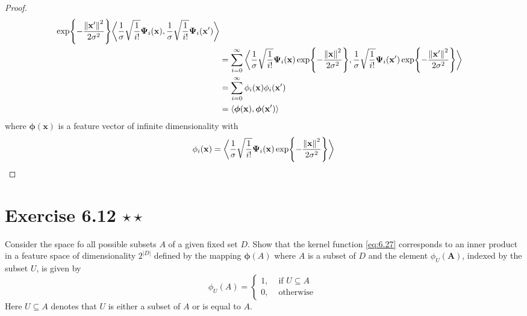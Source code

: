 \begin{proof}
\begin{align*}
        \exp{-\frac{\norm{\mathbf{x}'}^2}{2\sigma^2}}
        \bigg\langle \frac{1}{\sigma}\sqrt{\frac{1}{i!}} \bm{\Psi}_i(\mathbf{x}),
        \frac{1}{\sigma}\sqrt{\frac{1}{i!}} \bm{\Psi}_i(\mathbf{x}') \bigg\rangle \\
        &= \sum_{i=0}^{\infty} \bigg\langle
        \frac{1}{\sigma}\sqrt{\frac{1}{i!}} \bm{\Psi}_i(\mathbf{x})
        \exp{-\frac{\norm{\mathbf{x}}^2}{2\sigma^2}},
        \frac{1}{\sigma}\sqrt{\frac{1}{i!}} \bm{\Psi}_i(\mathbf{x}')
        \exp{-\frac{\norm{\mathbf{x}'}^2}{2\sigma^2}} \bigg\rangle \\ 
        &= \sum_{i=0}^{\infty} \phi_i(\mathbf{x}) \phi_i(\mathbf{x}') \\
        &= \langle \bm{\phi}(\mathbf{x}), \bm{\phi}(\mathbf{x}') \rangle
    \end{align*}
    where $\bm{\phi}(\mathbf{x})$ is a feature vector of infinite dimensionality with
    \[
        \phi_i(\mathbf{x}) = 
        \bigg\langle
        \frac{1}{\sigma}\sqrt{\frac{1}{i!}} \bm{\Psi}_i(\mathbf{x})
        \exp{-\frac{\norm{\mathbf{x}}^2}{2\sigma^2}}\bigg\rangle
    \] 
\end{proof}

\section*{Exercise 6.12 $\star \star$}
Consider the space fo all possible subsets $A$ of a given fixed set $D$.
Show that the kernel function \eqref{eq:6.27} corresponds to an inner product in a feature
space of dimensionality $2^{|D|}$ defined by the mapping $\bm{\phi}(A)$ where $A$ 
is a subset of $D$ and the element $\phi_U(\mathbf{A})$, indexed by the subset
$U$, is given by
\begin{equation}\label{eq:6.95}\tag{6.95}
    \phi_U(A) = \begin{cases}
        1, & \text{ if }  U \subseteq A \\
        0, & \text{ otherwise }
    \end{cases}
\end{equation}
Here $U \subseteq A$ denotes that $U$ is either a subset of $A$ or is equal to $A$. 

\vspace{1em}

